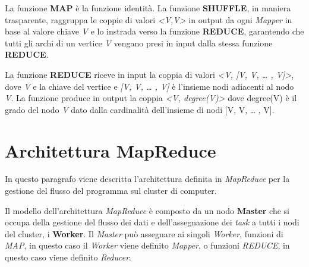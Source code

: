 \documentclass[LaM,binding=0.6cm]{sapthesis}
\begin{document}
La funzione \textbf{MAP} è la funzione identità. La funzione \textbf{SHUFFLE}, in maniera trasparente, raggruppa le coppie di valori \textit{<V,V>} in output da ogni \textit{Mapper} in base al valore chiave \textit{V} e lo instrada verso la funzione \textbf{REDUCE}, garantendo che tutti gli archi di un vertice \textit{V} vengano presi in input dalla stessa funzione \textbf{REDUCE}.

La funzione \textbf{REDUCE} riceve in input la coppia di valori \textit{<V, [V, V, … , V]>}, dove \textit{V} e la chiave del vertice  e \textit{[V, V, … , V]} è l'insieme nodi adiacenti al nodo \textit{V}. La funzione produce in output la coppia \textit{<V, degree(V)>} dove degree(V) è il grado del nodo \textit{V} dato dalla cardinalità dell'insieme di nodi [V, V, … , V].
 
\begin{minipage}{\linewidth}

\end{minipage}

\begin{minipage}{\linewidth}

\end{minipage}

\section{Architettura MapReduce}

In questo paragrafo viene descritta l'architettura definita in \textit{MapReduce} \cite{Dean:2008:MSD:1327452.1327492} per la gestione del flusso del programma sul cluster di computer.

Il modello dell'architettura \textit{MapReduce} è composto da un nodo \textbf{Master} che si occupa della gestione del flusso dei dati e dell'assegnazione dei \textit{task} a  tutti i nodi del cluster, i \textbf{Worker}.
Il \textit{Master}  può assegnare ai singoli \textit{Worker}, funzioni di \textit{MAP}, in questo caso il \textit{Worker} viene definito \textit{Mapper}, o funzioni \textit{REDUCE}, in questo caso viene definito \textit{Reducer}.
\end{document}
